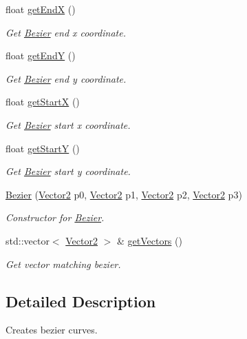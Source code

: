 \begin{DoxyCompactItemize}
float \mbox{\hyperlink{classBezier_aef4b9fbe3b5d30ea6b42de7fc38cf796}{get\+EndX}} ()
\begin{DoxyCompactList}\small\item\em Get \mbox{\hyperlink{classBezier}{Bezier}} end x coordinate. \end{DoxyCompactList}\item 
float \mbox{\hyperlink{classBezier_abb9094c95311d916aad946d90a9b5c12}{get\+EndY}} ()
\begin{DoxyCompactList}\small\item\em Get \mbox{\hyperlink{classBezier}{Bezier}} end y coordinate. \end{DoxyCompactList}\item 
float \mbox{\hyperlink{classBezier_a81efbcfa1f2bc8bf3c539dba1a4b80e0}{get\+StartX}} ()
\begin{DoxyCompactList}\small\item\em Get \mbox{\hyperlink{classBezier}{Bezier}} start x coordinate. \end{DoxyCompactList}\item 
float \mbox{\hyperlink{classBezier_ae310b53e4d8b3d586bbc4d335ac4cc08}{get\+StartY}} ()
\begin{DoxyCompactList}\small\item\em Get \mbox{\hyperlink{classBezier}{Bezier}} start y coordinate. \end{DoxyCompactList}\item 
\mbox{\hyperlink{classBezier_aeee0e41ed64d1a61d7ac103d2300093b}{Bezier}} (\mbox{\hyperlink{classVector2}{Vector2}} p0, \mbox{\hyperlink{classVector2}{Vector2}} p1, \mbox{\hyperlink{classVector2}{Vector2}} p2, \mbox{\hyperlink{classVector2}{Vector2}} p3)
\begin{DoxyCompactList}\small\item\em Constructor for \mbox{\hyperlink{classBezier}{Bezier}}. \end{DoxyCompactList}\item 
std\+::vector$<$ \mbox{\hyperlink{classVector2}{Vector2}} $>$ \& \mbox{\hyperlink{classBezier_a26bf332b0c831e0f302f1d72ec782436}{get\+Vectors}} ()
\begin{DoxyCompactList}\small\item\em Get vector matching bezier. \end{DoxyCompactList}\end{DoxyCompactItemize}


\subsection{Detailed Description}
Creates bezier curves. 

